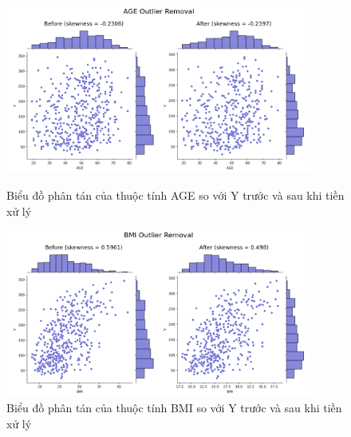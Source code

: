 \documentclass[runningheads]{llncs}
\begin{document}
\begin{figure}[H]
\centering
\includegraphics[width=0.9\textwidth]{AGEOR}
\caption{Biểu đồ phân tán của thuộc tính AGE so với Y trước và sau khi tiền xử lý} \label{fig2}
\vspace{0.5cm}
\includegraphics[width=0.9\textwidth]{BMIOR}
\caption{Biểu đồ phân tán của thuộc tính BMI so với Y trước và sau khi tiền xử lý} \label{fig2}
\end{figure}
\end{document}
